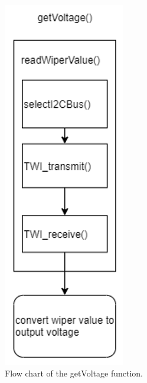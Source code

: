 \FloatBarrier
\begin{figure}[ht!]
    \section{}\label{sec:software_flowcharts}
    \centering
    \includegraphics[scale=0.7]{software_getVoltage_flow_chart.png}
    \caption{Flow chart of the getVoltage function.}
    \label{fig:getvoltage}
\end{figure}
\FloatBarrier
